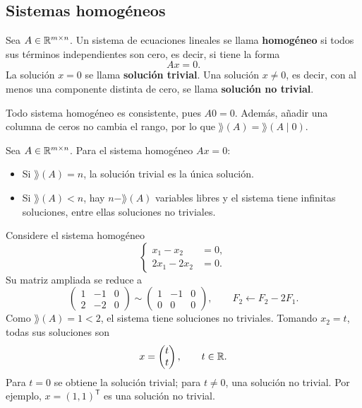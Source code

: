 \documentclass[compacto,10pt]{pubciencias-notas}
\begin{document}
\subsection{Sistemas homogéneos}

\begin{defi}
    Sea $A\in\Mat[\R]{m}{n}$. Un sistema de ecuaciones lineales se llama
    \textbf{homogéneo} si todos sus términos independientes son cero,
    es decir, si tiene la forma
    \[
        Ax=0.
    \]
    La solución $x=0$ se llama \textbf{solución trivial}.
    Una solución $x\ne0$, es decir, con al menos una componente distinta
    de cero, se llama \textbf{solución no trivial}.
\end{defi}

Todo sistema homogéneo es consistente, pues $A0=0$. Además, añadir una
columna de ceros no cambia el rango, por lo que $\rang(A)=\rang(A\mid0)$.
\setcounter{prop}{3}
\begin{teo}\label{sem03cl01:no-trivial}
Sea $A\in\Mat[\R]{m}{n}$. Para el sistema homogéneo $Ax=0$:
\begin{itemize}
\item Si $\rang(A)=n$, la solución trivial es la única solución.
\item Si $\rang(A)<n$, hay $n-\rang(A)$ variables libres y el sistema
      tiene infinitas soluciones, entre ellas soluciones no triviales.
\end{itemize}
\end{teo}

\begin{ejem}
Considere el sistema homogéneo
\[
    \left\{\begin{aligned}
        x_1-x_2&=0,\\
        2x_1-2x_2&=0.
    \end{aligned}\right.
\]
Su matriz ampliada se reduce a
\[
    \left(\begin{array}{cc|c}1&-1&0\\2&-2&0\end{array}\right)
    \sim
    \left(\begin{array}{cc|c}1&-1&0\\0&0&0\end{array}\right),
    \qquad F_2\leftarrow F_2-2F_1.
\]
Como $\rang(A)=1<2$, el sistema tiene soluciones no triviales.
Tomando $x_2=t$, todas sus soluciones son
\[
    x=\begin{pmatrix}t\\t\end{pmatrix},\qquad t\in\R.
\]
Para $t=0$ se obtiene la solución trivial; para $t\ne0$, una solución
no trivial. Por ejemplo, $x=(1,1)^{\mathsf T}$ es una solución no trivial.
\end{ejem}
\end{document}

